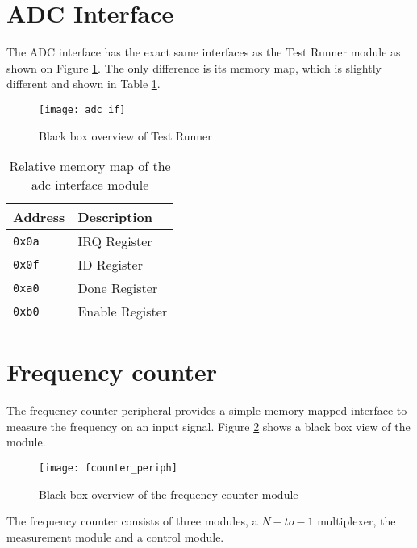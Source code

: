 \newpage
\section{ADC Interface}
The ADC interface has the exact same interfaces as the Test Runner module as shown
on Figure \ref{figure:adc_if_blackbox}. The only difference is its memory map, which is slightly different
and shown in Table \ref{table:adc_memorymap}.

\begin{figure}[h!]
\begin{center}
\texttt{[image: adc\_if]}
\caption{Black box overview of Test Runner}
\label{figure:adc_if_blackbox}
\end{center}
\end{figure}

\begin{table}[h!]
\centering
\begin{tabular}{ | l | l | }
 \hline
   Address       & Description \\
 \hline
   \texttt{0x0a} & IRQ Register \\
 \hline
   \texttt{0x0f} & ID Register \\
 \hline
   \texttt{0xa0} & Done Register \\
 \hline
   \texttt{0xb0} & Enable Register \\
 \hline
\end{tabular}
\caption{Relative memory map of the adc interface module}
\label{table:adc_memorymap}
\end{table}


\newpage
\section{Frequency counter}
The frequency counter peripheral provides a simple memory-mapped interface to
measure the frequency on an input signal. Figure \ref{figure:fcounter_blackbox}
shows a black box view of the module.

\begin{figure}[h!]
\begin{center}
\texttt{[image: fcounter\_periph]}
\caption{Black box overview of the frequency counter module}
\label{figure:fcounter_blackbox}
\end{center}
\end{figure}

The frequency counter consists
of three modules, a $N-to-1$ multiplexer, the measurement module and a control module.

